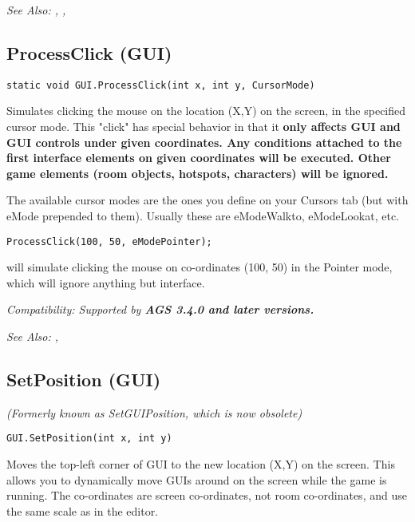 \it{See Also:} , ,


\subsection{ProcessClick (GUI)}\label{GUI.ProcessClick}%

\begin{verbatim}
static void GUI.ProcessClick(int x, int y, CursorMode)
\end{verbatim}
Simulates clicking the mouse on the location (X,Y) on the screen, in the
specified cursor mode. This "click" has special behavior in that it \bf{only
affects GUI and GUI controls} under given coordinates. Any conditions attached
to the first interface elements on given coordinates will be executed.
Other game elements (room objects, hotspots, characters) will be \bf{ignored}.

The available cursor modes are the ones you define on your Cursors tab (but with eMode
prepended to them). Usually these are eModeWalkto, eModeLookat, etc.

\begin{verbatim}
ProcessClick(100, 50, eModePointer);
\end{verbatim}
will simulate clicking the mouse on co-ordinates (100, 50) in the Pointer mode,
which will ignore anything but interface.

\it{Compatibility:} Supported by \bf{AGS 3.4.0} and later versions.

\it{See Also:} ,


\subsection{SetPosition (GUI)}\label{GUI.SetPosition}%

\it{(Formerly known as SetGUIPosition, which is now obsolete)}

\begin{verbatim}
GUI.SetPosition(int x, int y)
\end{verbatim}
Moves the top-left corner of GUI to the new location (X,Y) on the screen.
This allows you to dynamically move GUIs around on the screen while the
game is running. The co-ordinates are screen co-ordinates, not room
co-ordinates, and use the same scale as in the editor.

